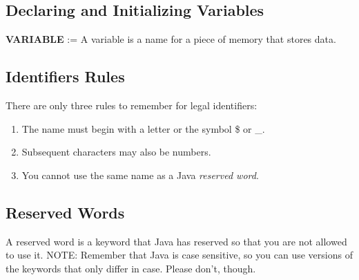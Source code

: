 \documentclass{article}
\begin{document}
\subsection{Declaring and Initializing Variables}
\textbf{VARIABLE} := A variable is a name for a piece of memory that stores data.

\subsection{Identifiers Rules}
There are only three rules to remember for legal identifiers:
\begin{enumerate}
	\item The name must begin with a letter or the symbol \$ or \_.
	\item Subsequent characters may also be numbers.
	\item You cannot use the same name as a Java \textit{reserved word}.
\end{enumerate}

\subsection{Reserved Words}
A reserved word is a keyword that Java has reserved so that you are not allowed to use it.
NOTE: Remember that Java is case sensitive, so you can use versions of the keywords that only differ in case. Please don't, though.
\end{document}
